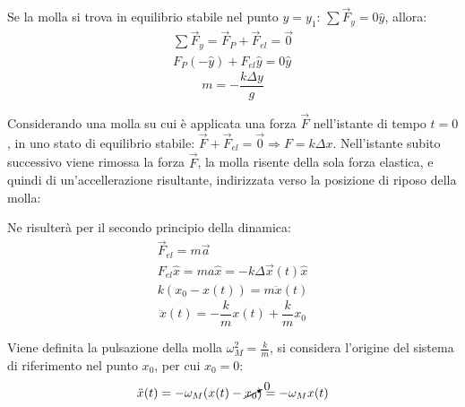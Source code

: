 \documentclass{article}
\numberwithin{equation}{subsection}
\begin{document}
Se la molla si trova in equilibrio stabile nel punto $y=y_1$: $\sum\vec{F}_y=0\hat{y}$, 
allora:
\begin{gather*}
    \sum\vec{F}_y=\vec{F}_P+\vec{F}_{el}=\vec0\\
     F_P(-\hat{y})+F_{el}\hat{y}=0\hat{y}
\end{gather*}
\begin{equation}
    m=\displaystyle-\frac{k\Delta y}{g}
\end{equation}

Considerando una molla su cui è applicata una forza $\vec{F}$ nell'istante 
di tempo $t=0$, in uno stato di equilibrio stabile: 
$\vec{F}+\vec{F}_{el}=\vec{0}\Rightarrow F=k\Delta x$. 
Nell'istante subito successivo viene rimossa la forza $\vec{F}$, 
la molla risente della sola forza elastica, e quindi
di un'accellerazione risultante, indirizzata 
verso la posizione di riposo della molla:

\begin{center}\end{center} 

Ne risulterà per il secondo principio della dinamica:
\begin{gather*}
    \vec{F}_{el}=m\vec{a}\\
    F_{el}\hat{x}=ma\hat{x}=-k\Delta  \vec x(t)\hat{x}\\
    k(x_0-x(t))=m\ddot x(t)
\end{gather*}
\begin{equation}
    \ddot x(t)=-\displaystyle\frac{k}{m}x(t)+\frac{k}{m}x_0
\end{equation}

Viene definita la pulsazione della molla $\omega_M^{2}=\displaystyle\frac{k}{m}$, 
si considera l'origine del sistema di riferimento nel punto $x_0$, per cui $x_0=0$:
\begin{equation*}
    \ddot x(t)=-\omega_M(x(t)-\cancelto{0}{x_0})=-\omega_Mx(t)
\end{equation*}
\end{document}
